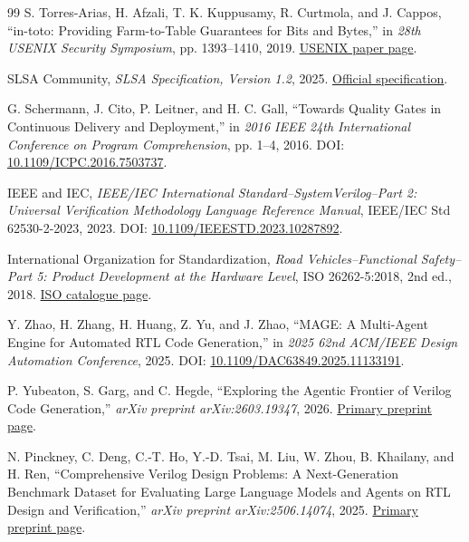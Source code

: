 \documentclass[UTF8,a4paper,zihao=-4,oneside]{ctexart}
\begin{document}
\begin{thebibliography}{99}
S. Torres-Arias, H. Afzali, T. K. Kuppusamy, R. Curtmola, and J. Cappos,
``in-toto: Providing Farm-to-Table Guarantees for Bits and Bytes,''
in \emph{28th USENIX Security Symposium}, pp. 1393--1410, 2019.
\href{https://www.usenix.org/conference/usenixsecurity19/presentation/torres-arias}{USENIX paper page}.

SLSA Community, \emph{SLSA Specification, Version 1.2}, 2025.
\href{https://slsa.dev/spec/v1.2/}{Official specification}.

G. Schermann, J. Cito, P. Leitner, and H. C. Gall,
``Towards Quality Gates in Continuous Delivery and Deployment,''
in \emph{2016 IEEE 24th International Conference on Program Comprehension},
pp. 1--4, 2016. DOI: \href{https://doi.org/10.1109/ICPC.2016.7503737}{10.1109/ICPC.2016.7503737}.

IEEE and IEC,
\emph{IEEE/IEC International Standard--SystemVerilog--Part 2: Universal Verification
Methodology Language Reference Manual}, IEEE/IEC Std 62530-2-2023, 2023.
DOI: \href{https://doi.org/10.1109/IEEESTD.2023.10287892}{10.1109/IEEESTD.2023.10287892}.

International Organization for Standardization,
\emph{Road Vehicles--Functional Safety--Part 5: Product Development at the Hardware Level},
ISO 26262-5:2018, 2nd ed., 2018. \href{https://www.iso.org/standard/68387.html}{ISO catalogue page}.

Y. Zhao, H. Zhang, H. Huang, Z. Yu, and J. Zhao,
``MAGE: A Multi-Agent Engine for Automated RTL Code Generation,''
in \emph{2025 62nd ACM/IEEE Design Automation Conference}, 2025.
DOI: \href{https://doi.org/10.1109/DAC63849.2025.11133191}{10.1109/DAC63849.2025.11133191}.

P. Yubeaton, S. Garg, and C. Hegde,
``Exploring the Agentic Frontier of Verilog Code Generation,''
\emph{arXiv preprint arXiv:2603.19347}, 2026.
\href{https://arxiv.org/abs/2603.19347}{Primary preprint page}.

N. Pinckney, C. Deng, C.-T. Ho, Y.-D. Tsai, M. Liu, W. Zhou, B. Khailany, and H. Ren,
``Comprehensive Verilog Design Problems: A Next-Generation Benchmark Dataset for
Evaluating Large Language Models and Agents on RTL Design and Verification,''
\emph{arXiv preprint arXiv:2506.14074}, 2025.
\href{https://arxiv.org/abs/2506.14074}{Primary preprint page}.


\end{thebibliography}
\end{document}
